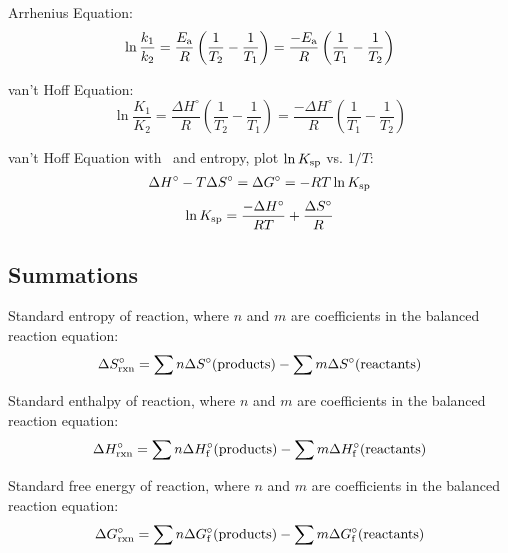 \documentclass[10pt]{article}
\begin{document}
Arrhenius Equation:
\begin{equation*}
\ln \frac{k_1}{k_2} = \frac{E_\textnormal{a}}{R}\left(\frac{1}{T_2} - \frac{1}{T_1}\right) = \frac{-E_\textnormal{a}}{R}\left(\frac{1}{T_1}-\frac{1}{T_2}\right)
\end{equation*}

van't Hoff Equation:
\begin{equation*}
\ln \frac{K_1}{K_2} = \frac{\Delta H^\circ}{R}\left(\frac{1}{T_2}-\frac{1}{T_1}\right) = \frac{-\Delta H^\circ}{R}\left(\frac{1}{T_1}-\frac{1}{T_2}\right)
\end{equation*}

van't Hoff Equation with \Ksp\ and entropy, plot $\ln K_\textnormal{sp}$ vs. $1/T$:
\begin{equation*}
\Delta H^{\circ} - T\Delta S^{\circ} = \Delta G^{\circ} = -RT \ln K_\textnormal{sp}
\end{equation*}
\begin{equation*}
\ln K_\textnormal{sp} = \frac{-\Delta H^{\circ}}{RT} + \frac{\Delta S^{\circ}}{R}
\end{equation*}

\subsection{Summations}

Standard entropy of reaction, where $n$ and $m$ are coefficients in the balanced reaction equation:
\begin{equation*}
\Delta S\not_\textnormal{rxn} = \sum{n\Delta S\not(\textnormal{products})}-\sum{m\Delta S\not(\textnormal{reactants})}
\end{equation*}

Standard enthalpy of reaction, where $n$ and $m$ are coefficients in the balanced reaction equation:
\begin{equation*}
\Delta H\not_\textnormal{rxn} = \sum{n\Delta H\not_\textnormal{f}(\textnormal{products})}-\sum{m\Delta H\not_\textnormal{f}(\textnormal{reactants})}
\end{equation*}

Standard free energy of reaction, where $n$ and $m$ are coefficients in the balanced reaction equation:
\begin{equation*}
\Delta G\not_\textnormal{rxn} = \sum{n\Delta G\not_\textnormal{f}(\textnormal{products})}-\sum{m\Delta G\not_\textnormal{f}(\textnormal{reactants})}
\end{equation*}

\end{document}
